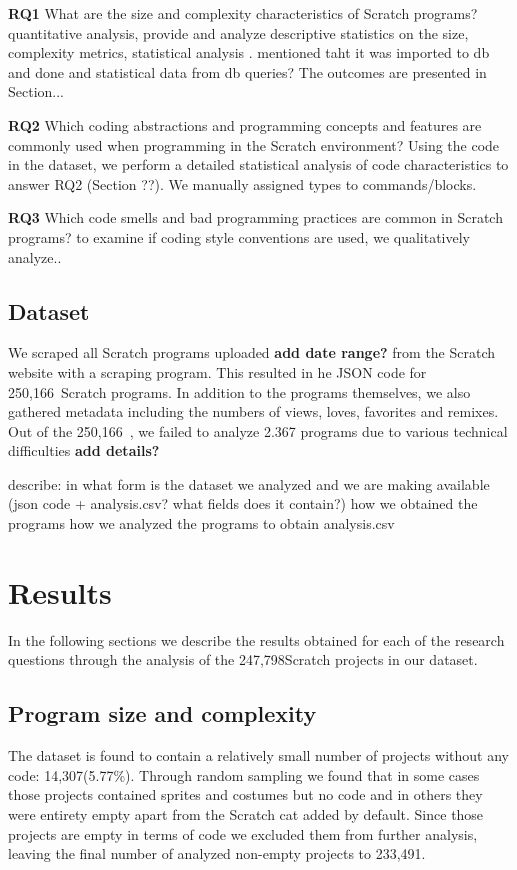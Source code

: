 \documentclass{sig-alternate}
\newcommand{\nPrograms}{250,166}
\newcommand{\nAnalyzedPrograms}{247,798}
\newcommand{\nemptyPrograms}{14,307}
\newcommand{\nScriptPrograms}{233,491}
\newcommand{\todo}[1]{\textbf{#1}}
\begin{document}
\textbf{RQ1} What are the size and complexity characteristics of Scratch programs? quantitative analysis, provide and analyze descriptive statistics on the size, complexity metrics, statistical analysis . mentioned taht it was imported to db and done and statistical data from db queries? The outcomes are presented in Section...

\textbf{RQ2} Which coding abstractions and programming concepts and features are commonly used when programming in the Scratch environment? Using the code in the dataset, we perform a detailed statistical analysis of code characteristics to answer RQ2 (Section ??). We manually assigned types to commands/blocks.

\textbf{RQ3} Which code smells and bad programming practices are common in Scratch programs?  to examine if coding style conventions are used, we qualitatively analyze..

\subsection{Dataset}
\label{dataset}

We scraped all Scratch programs uploaded \todo{add date range?} from the Scratch website with a scraping program. This resulted in he JSON code for \nPrograms~Scratch programs. In addition to the programs themselves, we also gathered metadata including the numbers of views, loves, favorites and remixes. Out of the \nPrograms~, we failed to analyze 2.367 programs due to various technical difficulties \todo{add details?} 

describe:
in what form is the dataset we analyzed and we are making available (json code + analysis.csv? what fields does it contain?)
how we obtained the programs
how we analyzed the programs to obtain analysis.csv

\section{Results}

In the following sections we describe the results obtained for each of the research questions through the analysis of the \nAnalyzedPrograms Scratch projects in our dataset.

\subsection{Program size and complexity}

The dataset is found to contain a relatively small number of projects without any code: \nemptyPrograms (5.77\%). Through random sampling we found that in some cases those projects contained sprites and costumes but no code and in others they were entirety empty apart from the Scratch cat added by default. Since those projects are empty in terms of code we excluded them from further analysis, leaving the final number of analyzed non-empty projects to \nScriptPrograms.
\end{document}

